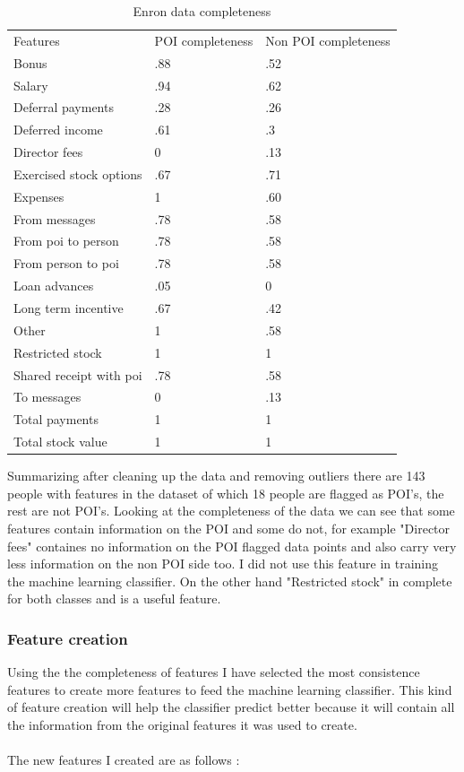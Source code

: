 \documentclass[12pt]{article}%
\begin{document}
\newpage
\begin{table}[!htb]
\centering
\caption{Enron data completeness}
\label{my-label}
\begin{tabular}{lll}
 Features & POI completeness & Non POI completeness \\
 Bonus & .88 & .52 \\
 Salary & .94 & .62 \\
 Deferral payments & .28 & .26 \\
 Deferred income & .61 & .3 \\
 Director fees & 0 & .13 \\
 Exercised stock options & .67 & .71 \\
 Expenses & 1 & .60 \\
 From messages & .78 & .58 \\
 From poi to person & .78 & .58 \\
 From person to poi & .78 & .58 \\
 Loan advances & .05 & 0 \\
 Long term incentive & .67 & .42 \\
 Other & 1 & .58 \\
 Restricted stock & 1 & 1 \\
 Shared receipt with poi & .78 & .58 \\
 To messages & 0 & .13 \\
 Total payments & 1 & 1 \\
 Total stock value & 1 & 1 \\
 
\end{tabular}
\end{table}

Summarizing after cleaning up the data and removing outliers there are 143 people with features in the dataset of which 18 people are flagged as POI's, the rest are not POI's. Looking at the completeness of the data we can see that some features contain information on the POI and some do not, for example "Director fees" containes no information on the POI flagged data points and also carry very less information on the non POI side too. I did not use this feature in training the machine learning classifier. On the other hand "Restricted stock" in complete for both classes and is a useful feature.
\newpage
\subsubsection*{Feature creation}

Using the the completeness of features I have selected the most consistence features to create more features to feed the machine learning classifier. This kind of feature creation will help the classifier predict better because it will contain all the information from the original features it was used to create.
\\
\\
The new features I created are as follows :
\end{document}
